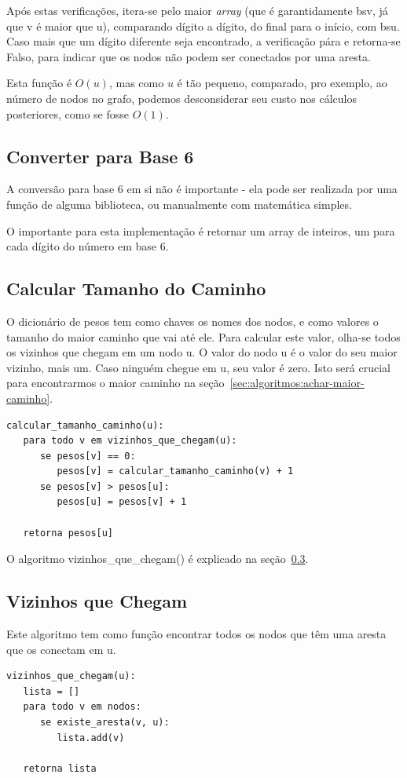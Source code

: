 \documentclass[12pt]{article}
\begin{document}
Após estas verifica\c{c}ões, itera-se pelo maior \textit{array} (que é garantidamente {\sf bsv}, já que {\sf v} é maior que {\sf u}), comparando dígito a dígito, do final para o início, com {\sf bsu}. Caso mais que um dígito diferente seja encontrado, a verifica\c{c}ão pára e retorna-se Falso, para indicar que os nodos não podem ser conectados por uma aresta.

Esta fun\c{c}ão é $O(u)$, mas como $u$ é tão pequeno, comparado, pro exemplo, ao número de nodos no grafo, podemos desconsiderar seu custo nos cálculos posteriores, como se fosse $O(1)$.

\subsection{Converter para Base 6}\label{sec:algoritmos:base6}
A conversão para base 6 em si não é importante - ela pode ser realizada por uma fun\c{c}ão de alguma biblioteca, ou manualmente com matemática simples. 

O importante para esta implementação é retornar um array de inteiros, um para cada dígito do número em base 6.

\subsection{Calcular Tamanho do Caminho}\label{sec:algoritmos:calcular-tamanho-caminhos}
O dicionário de pesos tem como chaves os nomes dos nodos, e como valores o tamanho do maior caminho que vai até ele.
Para calcular este valor, olha-se todos os vizinhos que chegam em um nodo {\sf u}. O valor do nodo {\sf u} é o valor do seu maior vizinho, mais um. Caso ninguém chegue em {\sf u}, seu valor é zero.
Isto será crucial para encontrarmos o maior caminho na se\c{c}ão~\ref{sec:algoritmos:achar-maior-caminho}.
\begin{lstlisting}
calcular_tamanho_caminho(u):
   para todo v em vizinhos_que_chegam(u):
      se pesos[v] == 0:
         pesos[v] = calcular_tamanho_caminho(v) + 1
      se pesos[v] > pesos[u]:
         pesos[u] = pesos[v] + 1

   retorna pesos[u]
\end{lstlisting}

O algoritmo {\sf vizinhos\_que\_chegam()} é explicado na se\c{c}ão~\ref{sec:algoritmos:vizinhos-que-chegam}.


\subsection{Vizinhos que Chegam}\label{sec:algoritmos:vizinhos-que-chegam}
Este algoritmo tem como fun\c{c}ão encontrar todos os nodos que têm uma aresta que os conectam em {\sf u}.
\begin{lstlisting}
vizinhos_que_chegam(u):
   lista = []
   para todo v em nodos:
      se existe_aresta(v, u):
         lista.add(v)

   retorna lista
\end{lstlisting}
\end{document}
